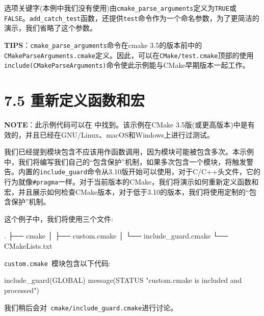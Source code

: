 
选项关键字(本例中我们没有使用)由\texttt{cmake\_parse\_arguments}定义为\texttt{TRUE}或\texttt{FALSE}。\texttt{add\_catch\_test}函数，还提供\texttt{test}命令作为一个命名参数，为了更简洁的演示，我们省略了这个参数。

\begin{myInfoBox}
\textbf{TIPS}：\texttt{cmake\_parse\_arguments}命令在cmake 3.5的版本前中的\texttt{CMakeParseArguments.cmake}定义。因此，可以在\texttt{CMake/test.cmake}顶部的使用\texttt{include(CMakeParseArguments)}命令使此示例能与CMake早期版本一起工作。
\end{myInfoBox}


\section{7.5 重新定义函数和宏}

\begin{myInfoBox}
\textbf{NOTE}：此示例代码可以在  中找到。该示例在CMake 3.5版(或更高版本)中是有效的，并且已经在GNU/Linux、macOS和Windows上进行过测试。
\end{myInfoBox}

我们已经提到模块包含不应该用作函数调用，因为模块可能被包含多次。本示例中，我们将编写我们自己的“包含保护”机制，如果多次包含一个模块，将触发警告。内置的\texttt{include\_guard}命令从3.10版开始可以使用，对于C/C++头文件，它的行为就像\texttt{\#pragma}一样。对于当前版本的CMake，我们将演示如何重新定义函数和宏，并且展示如何检查CMake版本，对于低于3.10的版本，我们将使用定制的“包含保护”机制。


这个例子中，我们将使用三个文件:

\begin{codebox}[shell]
.
├── cmake
│     ├── custom.cmake
│     └── include_guard.cmake
└── CMakeLists.txt
\end{codebox}

\texttt{custom.cmake }模块包含以下代码:

\begin{codebox}[cmake]
include_guard(GLOBAL)
message(STATUS "custom.cmake is included and processed")
\end{codebox}

我们稍后会对\texttt{ cmake/include\_guard.cmake}进行讨论。


